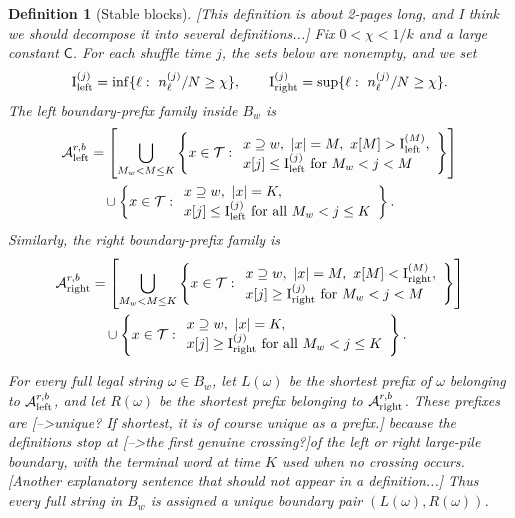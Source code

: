 \documentclass[11pt]{article}
\newtheorem{defi}{Definition}
\newcommand{\cA}{\mathcal A}
\newcommand{\cT}{\mathcal T}
\newcommand{\ileft}{\mathrm I_{\rm left}}
\newcommand{\iright}{\mathrm I_{\rm right}}
\newcommand{\jscomment}[1]{\textup{\textsf{\color{blue}[#1]}}}
\begin{document}
\begin{defi}[Stable blocks]
\jscomment{This definition is about 2-pages long, and I think we should decompose it into several definitions...}
Fix \(0<\chi<1/k\) and a large constant \(\mathsf C\). For each shuffle time \(j\), the sets below are nonempty, and we set
\[
    \ileft^{(j)}=\inf\{\ell:\ n_\ell^{(j)}/N\ge\chi\},
    \qquad
    \iright^{(j)}=\sup\{\ell:\ n_\ell^{(j)}/N\ge\chi\}.
\]
The left boundary-prefix family inside \(B_w\) is
\[
    \begin{aligned}
    \cA_{\rm left}^{r,b}
    &=
    \left[\bigcup_{M_w<M\le K}
    \left\{x\in\cT:
    \begin{array}{l}
    x\supseteq w,\ |x|=M,\ x[M]>\ileft^{(M)},\\
    x[j]\le\ileft^{(j)}\text{ for }M_w<j<M
    \end{array}\right\}\right]
    \\
    &\quad\cup
    \left\{x\in\cT:
    \begin{array}{l}
    x\supseteq w,\ |x|=K,\\
    x[j]\le\ileft^{(j)}\text{ for all }M_w<j\le K
    \end{array}\right\}.
    \end{aligned}
 \]
Similarly, the right boundary-prefix family is
\[
    \begin{aligned}
    \cA_{\rm right}^{r,b}
    &=
    \left[\bigcup_{M_w<M\le K}
    \left\{x\in\cT:
    \begin{array}{l}
    x\supseteq w,\ |x|=M,\ x[M]<\iright^{(M)},\\
    x[j]\ge\iright^{(j)}\text{ for }M_w<j<M
    \end{array}\right\}\right]
    \\
    &\quad\cup
    \left\{x\in\cT:
    \begin{array}{l}
    x\supseteq w,\ |x|=K,\\
    x[j]\ge\iright^{(j)}\text{ for all }M_w<j\le K
    \end{array}\right\}.
    \end{aligned}
 \]

For every full legal string \(\omega\in B_w\), let \(L(\omega)\) be the
shortest prefix of \(\omega\) belonging to
\(\cA_{\rm left}^{r,b}\), and let \(R(\omega)\) be the shortest prefix
belonging to \(\cA_{\rm right}^{r,b}\). These prefixes are \jscomment{-->unique? If shortest, it is of course unique as a prefix.} because
the definitions stop at \jscomment{-->the first genuine crossing?}of the left or right
large-pile boundary, with the terminal word at time \(K\) used when no
crossing occurs.\jscomment{Another explanatory sentence that should not appear in a definition...} Thus every full string in \(B_w\) is assigned a unique
boundary pair \((L(\omega),R(\omega))\).


\end{defi}
\end{document}
